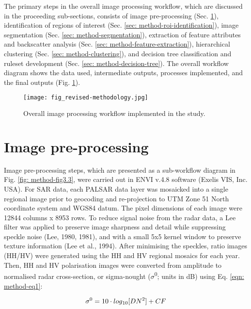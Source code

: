 The primary steps in the overall image processing workflow, which are discussed in the proceeding sub-sections, consists of image pre-processing (Sec. \ref{sec: method-preprocessing}), identification of regions of interest (Sec. \ref{sec: method-roi-identification}), image segmentation (Sec. \ref{sec: method-segmentation}), extraction of feature attributes and backscatter analysis (Sec. \ref{sec: method-feature-extraction}), hierarchical clustering (Sec. \ref{sec: method-clustering}), and decision tree classification and ruleset development (Sec. \ref{sec: method-decision-tree}). The overall workflow diagram shows the data used, intermediate outputs, processes implemented, and the final outputs (Fig. \ref{fig: method-fig3.2}).

\begin{figure}
	\centering
	\texttt{[image: fig\_revised-methodology.jpg]}
	\caption[Overall image processing workflow implemented in the study.]{Overall image processing workflow implemented in the study.}
	\label{fig: method-fig3.2}
\end{figure}

\section{Image pre-processing}
\label{sec: method-preprocessing}

Image pre-processing steps, which are presented as a sub-workflow diagram in Fig. \ref{fig: method-fig3.3}, were carried out in ENVI v.4.8 software (Exelis VIS, Inc. USA). For SAR data, each PALSAR data layer was mosaicked into a single regional image prior to geocoding and re-projection to UTM Zone 51 North coordinate system and WGS84 datum. The pixel dimensions of each image were 12844 columns x 8953 rows. To reduce signal noise from the radar data, a Lee filter was applied to preserve image sharpness and detail while suppressing speckle noise (Lee, 1980, 1981), and with a small 5x5 kernel window to preserve texture information (Lee et al., 1994). After minimising the speckles, ratio images (HH/HV) were generated using the HH and HV regional mosaics for each year. Then, HH and HV polarisation images were converted from amplitude to normalised radar cross-section, or sigma-nought ($\sigma$\textsuperscript{0}; units in dB) using Eq. \ref{eqn: method-eq1}:

\begin{equation} \label{eqn: method-eq1}
		\sigma^0=10\cdot log\textsubscript{10}[DN^2]+CF
\end{equation}

